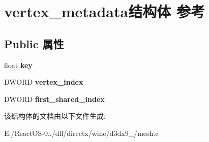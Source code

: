 \hypertarget{structvertex__metadata}{}\section{vertex\+\_\+metadata结构体 参考}
\label{structvertex__metadata}
\subsection*{Public 属性}
\begin{DoxyCompactItemize}
\item 
\mbox{\label{structvertex__metadata_a6ab8a0e6789694deb332bae0aefecc87}} 
float {\bfseries key}
\item 
\mbox{\label{structvertex__metadata_a8754da3f973b70e51987dfc7de3fe54a}} 
D\+W\+O\+RD {\bfseries vertex\+\_\+index}
\item 
\mbox{\label{structvertex__metadata_a32d332dc8fd77bf490b192fc5c158b91}} 
D\+W\+O\+RD {\bfseries first\+\_\+shared\+\_\+index}
\end{DoxyCompactItemize}


该结构体的文档由以下文件生成\+:\begin{DoxyCompactItemize}
\item 
E\+:/\+React\+O\+S-\/0../dll/directx/wine/d3dx9\+\_/mesh.\+c\end{DoxyCompactItemize}
